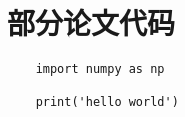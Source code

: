 
\chapter{部分论文代码}

\lstset{language=python}
\begin{lstlisting}
    import numpy as np
    
    print('hello world')
    
\end{lstlisting}
